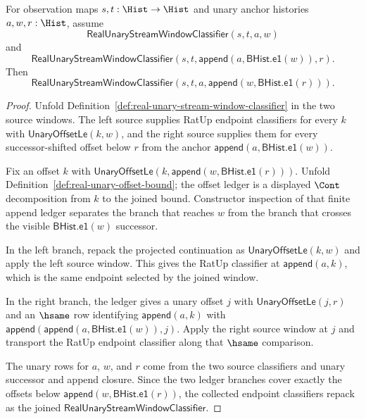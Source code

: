 \begin{theorem}
\label{thm:real-unary-stream-window-adjacent-concatenation}
For observation maps $s,t:\Hist\to\Hist$ and unary anchor histories
$a,w,r:\Hist$, assume
$$
\mathsf{RealUnaryStreamWindowClassifier}(s,t,a,w)
$$
and
$$
\mathsf{RealUnaryStreamWindowClassifier}
(s,t,\mathsf{append}(a,\mathsf{BHist.e1}(w)),r).
$$
Then
$$
\mathsf{RealUnaryStreamWindowClassifier}
(s,t,a,\mathsf{append}(w,\mathsf{BHist.e1}(r))).
$$
\end{theorem}
\begin{proof}
Unfold Definition~\ref{def:real-unary-stream-window-classifier} in the two
source windows. The left source supplies RatUp endpoint classifiers for every
$k$ with $\mathsf{UnaryOffsetLe}(k,w)$, and the right source supplies them for
every successor-shifted offset below $r$ from the anchor
$\mathsf{append}(a,\mathsf{BHist.e1}(w))$.

Fix an offset $k$ with
$\mathsf{UnaryOffsetLe}(k,\mathsf{append}(w,\mathsf{BHist.e1}(r)))$. Unfold
Definition~\ref{def:real-unary-offset-bound}; the offset ledger is a displayed
$\Cont$ decomposition from $k$ to the joined bound. Constructor inspection of
that finite append ledger separates the branch that reaches $w$ from the branch
that crosses the visible $\mathsf{BHist.e1}(w)$ successor.

In the left branch, repack the projected continuation as
$\mathsf{UnaryOffsetLe}(k,w)$ and apply the left source window. This gives the
RatUp classifier at
$\mathsf{append}(a,k)$, which is the same endpoint selected by the joined
window.

In the right branch, the ledger gives a unary offset $j$ with
$\mathsf{UnaryOffsetLe}(j,r)$ and an $\hsame$ row identifying
$\mathsf{append}(a,k)$ with
$\mathsf{append}(\mathsf{append}(a,\mathsf{BHist.e1}(w)),j)$. Apply the right
source window at $j$ and transport the RatUp endpoint classifier along that
$\hsame$ comparison.

The unary rows for $a$, $w$, and $r$ come from the two source classifiers and
unary successor and append closure. Since the two ledger branches cover exactly
the offsets below $\mathsf{append}(w,\mathsf{BHist.e1}(r))$, the collected
endpoint classifiers repack as the joined
$\mathsf{RealUnaryStreamWindowClassifier}$.
\end{proof}


